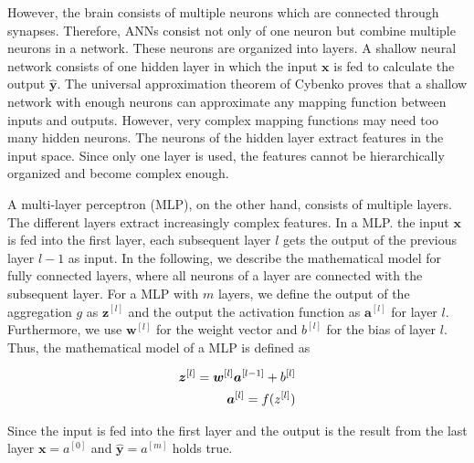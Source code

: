 However, the brain consists of multiple neurons which are connected through synapses.
Therefore, ANNs consist not only of one neuron but combine multiple neurons in a network. 
These neurons are organized into layers.
A shallow neural network consists of one hidden layer in which the input \(\boldsymbol{x}\) is fed to calculate the output \(\boldsymbol{\hat{y}}\).
The universal approximation theorem of Cybenko  proves that a shallow network with enough neurons can approximate any mapping function between inputs and outputs.
However, very complex mapping functions may need too many hidden neurons.
The neurons of the hidden layer extract features in the input space.
Since only one layer is used, the features cannot be hierarchically organized and become complex enough.

A multi-layer perceptron (MLP), on the other hand, consists of multiple layers.
The different layers extract increasingly complex features.
In a MLP. the input \(\boldsymbol{x}\) is fed into the first layer, each subsequent layer \(l\) gets the output of the previous layer \(l-1\) as input.
In the following, we describe the mathematical model for fully connected layers, where all neurons of a layer are connected with the subsequent layer.
For a MLP with \(m\) layers, we define the output of the aggregation \(g\) as \(\boldsymbol{z}^{[l]}\) and the output the activation function as \(\boldsymbol{a}^{[l]}\) for layer \(l\).
Furthermore, we use \(\boldsymbol{w}^{[l]}\) for the weight vector and \(b^{[l]}\) for the bias of layer \(l\).
Thus, the mathematical model of a MLP is defined as

\begin{equation}\eqlbl{mlp}
	\begin{aligned}
		\boldsymbol{z}^{[l]} = \boldsymbol{w}^{[l]}\boldsymbol{a}^{[l-1]} + b^{[l]}\\
		\boldsymbol{a}^{[l]} = f({z}^{[l]})
	\end{aligned}
\end{equation}

Since the input is fed into the first layer and the output is the result from the last layer \(\boldsymbol{x} = {a}^{[0]}\) and \(\boldsymbol{\hat{y}} = {a}^{[m]}\) holds true.

